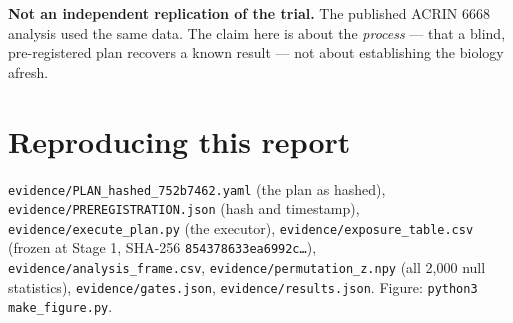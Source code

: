 \documentclass[11pt,a4paper]{article}
\begin{document}
\textbf{Not an independent replication of the trial.} The published ACRIN 6668 analysis used the
same data. The claim here is about the \emph{process} --- that a blind, pre-registered plan
recovers a known result --- not about establishing the biology afresh.

\section*{Reproducing this report}

\texttt{evidence/PLAN\_hashed\_752b7462.yaml} (the plan as hashed),
\texttt{evidence/PREREGISTRATION.json} (hash and timestamp),
\texttt{evidence/execute\_plan.py} (the executor),
\texttt{evidence/exposure\_table.csv} (frozen at Stage 1, SHA-256
\texttt{854378633ea6992c\ldots}), \texttt{evidence/analysis\_frame.csv},
\texttt{evidence/permutation\_z.npy} (all 2{,}000 null statistics),
\texttt{evidence/gates.json}, \texttt{evidence/results.json}. Figure:
\texttt{python3 make\_figure.py}.
\end{document}
